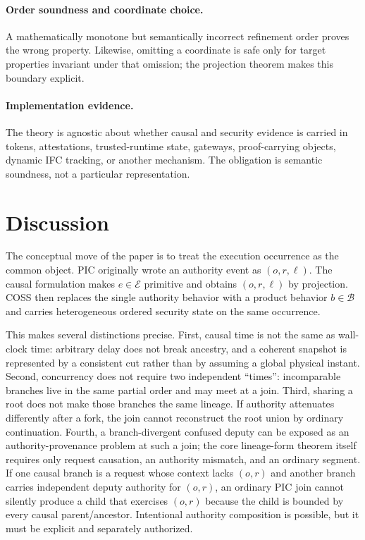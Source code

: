 \documentclass[10pt,twocolumn]{article}
\begin{document}
\paragraph{Order soundness and coordinate choice.}
A mathematically monotone but semantically incorrect refinement order proves
the wrong property.  Likewise, omitting a coordinate is safe only for target
properties invariant under that omission; the projection theorem makes this
boundary explicit.

\paragraph{Implementation evidence.}
The theory is agnostic about whether causal and security evidence is carried in
tokens, attestations, trusted-runtime state, gateways, proof-carrying objects,
dynamic IFC tracking, or another mechanism.  The obligation is semantic
soundness, not a particular representation.



\section{Discussion}

The conceptual move of the paper is to treat the execution occurrence as the
common object.  PIC originally wrote an authority event as $(o,r,\ell)$.  The
causal formulation makes $e\in\mathcal E$ primitive and obtains
$(o,r,\ell)$ by projection.  COSS then replaces the single authority behavior
with a product behavior $b\in\mathcal B$ and carries heterogeneous ordered
security state on the same occurrence.

This makes several distinctions precise.  First, causal time is not the same as
wall-clock time: arbitrary delay does not break ancestry, and a coherent
snapshot is represented by a consistent cut rather than by assuming a global
physical instant.  Second, concurrency does not require two independent
``times'': incomparable branches live in the same partial order and may meet at
a join.  Third, sharing a root does not make those branches the same lineage.
If authority attenuates differently after a fork, the join cannot reconstruct
the root union by ordinary continuation.  Fourth, a branch-divergent confused deputy can be exposed as an
authority-provenance problem at such a join; the core lineage-form theorem itself
requires only request causation, an authority mismatch, and an ordinary segment.  If one causal branch is a request
whose context lacks $(o,r)$ and another branch carries independent deputy
authority for $(o,r)$, an ordinary PIC join cannot silently produce a child
that exercises $(o,r)$ because the child is bounded by every causal
parent/ancestor.  Intentional authority composition is possible, but it must be
explicit and separately authorized.
\end{document}
